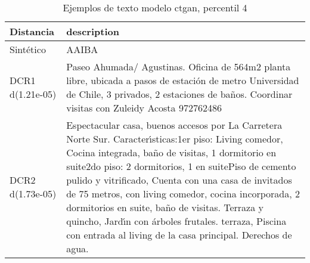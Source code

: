 \begin{table}[H]
\centering
\fontsize{10}{14}\selectfont
\caption{Ejemplos de texto modelo ctgan, percentil 4}
\label{table-example-economicos-a-2-ctgan-4p-text}
\begin{tabular}{|l|m{35em}|}
\hline
\rowcolor[gray]{0.8}
Distancia & description \\
\hline Sintético & AAIBA \\
\hline DCR1 d(1.21e-05) & Paseo Ahumada/ Agustinas. Oficina de 564m2 planta libre, ubicada a pasos de estaci\'on de metro Universidad de Chile, 3 privados, 2 estaciones de ba\~nos. Coordinar visitas con Zuleidy Acosta 972762486 \\
\hline DCR2 d(1.73e-05) & Espectacular casa, buenos accesos por La Carretera Norte Sur. Caracter{\'\i}sticas:1er piso: Living comedor, Cocina integrada, ba\~no de visitas, 1 dormitorio en suite2do piso: 2 dormitorios, 1 en suitePiso de cemento pulido y vitrificado, Cuenta con una casa de invitados de 75 metros, con living comedor, cocina incorporada, 2 dormitorios en suite, ba\~no de visitas. Terraza y quincho, Jard{\'\i}n con \'arboles frutales. terraza, Piscina con entrada al living de la casa principal. Derechos de agua. \\
\hline
\end{tabular}
\end{table}
